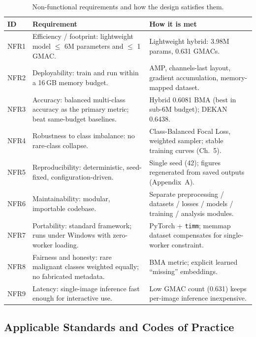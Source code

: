 \begin{table}[h]
\centering
\caption{Non-functional requirements and how the design satisfies them.}
\label{tab:nonfunctional-requirements}
\begin{tabular}{p{}p{}p{}}
\toprule
ID & Requirement & How it is met \\
\midrule
NFR1 & Efficiency / footprint: lightweight model $\le$ 6M parameters and $\le$ 1 GMAC. & Lightweight hybrid: 3.98M params, 0.631 GMACs. \\
NFR2 & Deployability: train and run within a 16\,GB memory budget. & AMP, channels-last layout, gradient accumulation, memory-mapped dataset. \\
NFR3 & Accuracy: balanced multi-class accuracy as the primary metric; beat same-budget baselines. & Hybrid 0.6081 BMA (best in sub-6M budget); DEKAN 0.6438. \\
NFR4 & Robustness to class imbalance: no rare-class collapse. & Class-Balanced Focal Loss, weighted sampler; stable training curves (Ch.~5). \\
NFR5 & Reproducibility: deterministic, seed-fixed, configuration-driven. & Single seed (42); figures regenerated from saved outputs (Appendix~A). \\
NFR6 & Maintainability: modular, importable codebase. & Separate preprocessing / datasets / losses / models / training / analysis modules. \\
NFR7 & Portability: standard framework; runs under Windows with zero-worker loading. & PyTorch + \texttt{timm}; memmap dataset compensates for single-worker constraint. \\
NFR8 & Fairness and honesty: rare malignant classes weighted equally; no fabricated metadata. & BMA metric; explicit learned ``missing'' embeddings. \\
NFR9 & Latency: single-image inference fast enough for interactive use. & Low GMAC count (0.631) keeps per-image inference inexpensive. \\
\bottomrule
\end{tabular}
\end{table}


\subsection{Applicable Standards and Codes of Practice}
\label{sec:standards}

